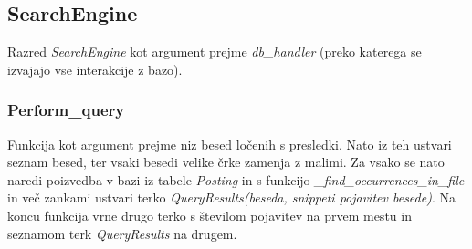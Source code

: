 \documentclass[runningheads]{llncs}
\begin{document}
\subsection{SearchEngine}
Razred \textit{SearchEngine} kot argument prejme \textit{db\_handler} (preko katerega se izvajajo vse interakcije z bazo).

\subsubsection{Perform\_query}
Funkcija kot argument prejme niz besed ločenih s presledki. Nato iz teh ustvari seznam besed, ter vsaki besedi velike črke zamenja z malimi. Za vsako se nato naredi poizvedba v bazi iz tabele \textit{Posting} in s funkcijo \textit{\_find\_occurrences\_in\_file} in več zankami ustvari terko \textit{QueryResults(beseda, snippeti pojavitev besede)}. Na koncu funkcija vrne drugo terko s številom pojavitev na prvem mestu in seznamom terk \textit{QueryResults} na drugem.
\end{document}
